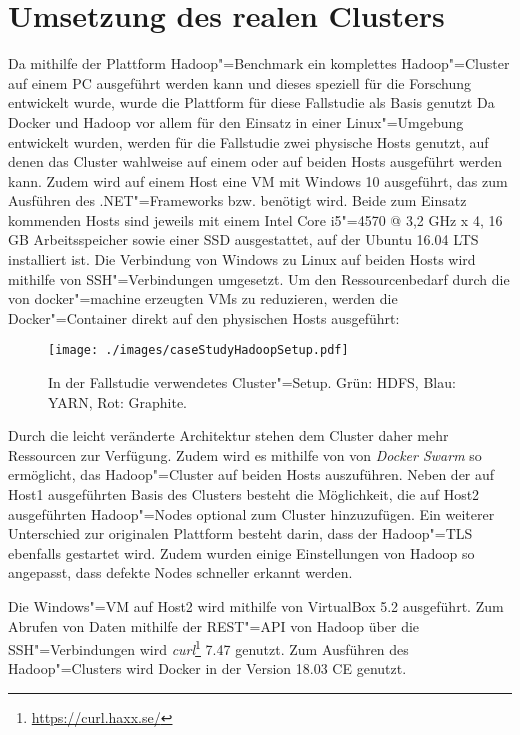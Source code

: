 \section{Umsetzung des realen Clusters}
\label{sec:aufbauCluster}

Da mithilfe der Plattform Hadoop"=Benchmark ein komplettes Hadoop"=Cluster auf einem PC ausgeführt werden kann und dieses speziell für die Forschung entwickelt wurde, wurde die Plattform für diese Fallstudie als Basis genutzt
Da Docker und Hadoop vor allem für den Einsatz in einer Linux"=Umgebung entwickelt wurden, werden für die Fallstudie zwei physische Hosts genutzt, auf denen das Cluster wahlweise auf einem oder auf beiden Hosts ausgeführt werden kann.
Zudem wird auf einem Host eine VM mit Windows 10 ausgeführt, das zum Ausführen des .NET"=Frameworks bzw. \sS benötigt wird.
Beide zum Einsatz kommenden Hosts sind jeweils mit einem Intel Core i5"=4570 @ 3,2 GHz x 4, 16 GB Arbeitsspeicher sowie einer SSD ausgestattet, auf der Ubuntu 16.04 LTS installiert ist.
Die Verbindung von Windows zu Linux auf beiden Hosts wird mithilfe von SSH"=Verbindungen umgesetzt.
Um den Ressourcenbedarf durch die von docker"=machine erzeugten VMs zu reduzieren, werden die Docker"=Container direkt auf den physischen Hosts ausgeführt:

\begin{figure}[h]
    \texttt{[image: ./images/caseStudyHadoopSetup.pdf]}
    \caption[In der Fallstudie verwendetes Cluster"=Setup]
    {In der Fallstudie verwendetes Cluster"=Setup.
        Grün: \ac{HDFS}, Blau: YARN, Rot: Graphite.}
    \label{fig:caseStudyHadoopSetup}
\end{figure}

Durch die leicht veränderte Architektur stehen dem Cluster daher mehr Ressourcen zur Verfügung.
Zudem wird es mithilfe von von \emph{Docker Swarm} so ermöglicht, das Hadoop"=Cluster auf beiden Hosts auszuführen.
Neben der auf Host1 ausgeführten Basis des Clusters besteht die Möglichkeit, die auf Host2 ausgeführten Hadoop"=Nodes optional zum Cluster hinzuzufügen.
Ein weiterer Unterschied zur originalen Plattform besteht darin, dass der Hadoop"=\ac{TLS} ebenfalls gestartet wird.
Zudem wurden einige Einstellungen von Hadoop so angepasst, dass defekte Nodes schneller erkannt werden.

Die Windows"=VM auf Host2 wird mithilfe von VirtualBox 5.2 ausgeführt.
Zum Abrufen von Daten mithilfe der REST"=API von Hadoop über die SSH"=Verbindungen wird \emph{curl}\footnote{\url{https://curl.haxx.se/}} 7.47 genutzt.
Zum Ausführen des Hadoop"=Clusters wird Docker in der Version 18.03 CE genutzt.

